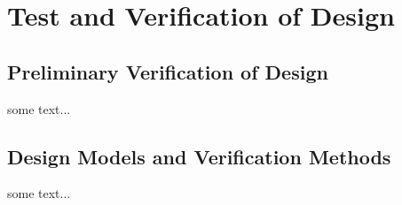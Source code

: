 \section{Test and Verification of Design}
\label{sec:test_verification}

\subsection{Preliminary Verification of Design}
some text...

\subsection{Design Models and Verification Methods}
some text...
